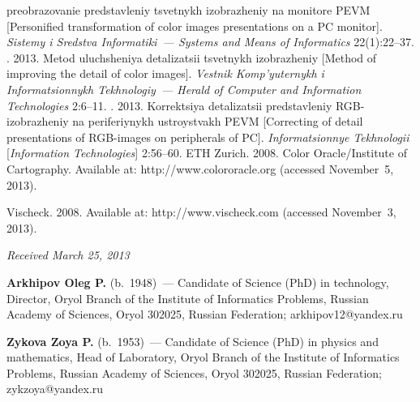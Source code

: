 \begin{multicols}{2}
{{\begin{thebibliography}{99}
preobrazovanie predstavleniy tsvetnykh izobrazheniy  na monitore PEVM [Personified 
transformation of color images presentations on a PC monitor]. \textit{Sistemy i
Sredstva Informatiki~--- Systems and 
Means of Informatics} 22(1):22--37.
  . 2013. Metod uluch\-she\-niya detalizatsii 
tsvetnykh izobrazheniy [Method of improving the detail of color images]. 
\textit{Vestnik Komp'yuternykh i Informatsionnykh Tekhnologiy~--- Herald of Computer 
and Information Technologies} 2:6--11.
  . 2013. Korrektsiya de\-ta\-li\-za\-tsii 
predstavleniy RGB-izobrazheniy na periferiynykh ustroystvakh PEVM [Correcting of 
detail presentations of RGB-images on peripherals of PC]. \textit{Informatsionnye 
Tekhnologii} [\textit{Information Technologies}] 2:56--60.
ETH Zurich.  2008. {Color Oracle/Institute of Cartography}.   Available at: 
{\sf http://www.colororacle.org} (accessed November~5, 2013).


 
Vischeck. 2008. Available at: {\sf http://www.vischeck.com}
(accessed November~3, 2013).
\end{thebibliography}
} }


\end{multicols}

\vspace*{-6pt}

\hfill{\small\textit{Received March 25, 2013}}

\vspace*{-18pt}

\Contr

\noindent
\textbf{Arkhipov Oleg P.} (b.\ 1948)~--- Candidate of Science (PhD) in technology, 
Director, Oryol Branch of the Institute of Informatics Problems, Russian Academy 
of Sciences, Oryol 302025, Russian Federation; arkhipov12@yandex.ru 


\vspace*{2pt}

\noindent
\textbf{Zykova Zoya P.} (b.\ 1953)~--- Candidate of Science (PhD) in physics and 
mathematics, Head of Laboratory, Oryol Branch of the Institute of Informatics 
Problems, Russian Academy of Sciences, Oryol 302025, Russian Federation; zykzoya@yandex.ru

 \label{end\stat}
 
\renewcommand{\bibname}{\protect\rm Литература}  
  
  